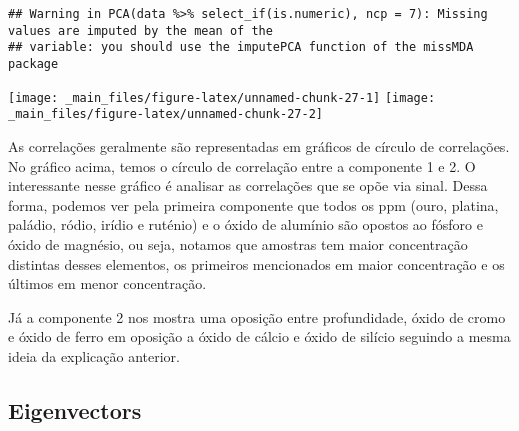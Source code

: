 \documentclass[
]{article}
\begin{document}
\begin{verbatim}
## Warning in PCA(data %>% select_if(is.numeric), ncp = 7): Missing values are imputed by the mean of the
## variable: you should use the imputePCA function of the missMDA package
\end{verbatim}

\begin{center}\texttt{[image: \_main\_files/figure-latex/unnamed-chunk-27-1]} \texttt{[image: \_main\_files/figure-latex/unnamed-chunk-27-2]} \end{center}

As correlações geralmente são representadas em gráficos de círculo de correlações. No gráfico acima, temos o círculo de correlação entre a componente 1 e 2. O interessante nesse gráfico é analisar as correlações que se opõe via sinal. Dessa forma, podemos ver pela primeira componente que todos os ppm (ouro, platina, paládio, ródio, irídio e ruténio) e o óxido de alumínio são opostos ao fósforo e óxido de magnésio, ou seja, notamos que amostras tem maior concentração distintas desses elementos, os primeiros mencionados em maior concentração e os últimos em menor concentração.

Já a componente 2 nos mostra uma oposição entre profundidade, óxido de cromo e óxido de ferro em oposição a óxido de cálcio e óxido de silício seguindo a mesma ideia da explicação anterior.

\hypertarget{eigenvectors}{%
\subsection{Eigenvectors}\label{eigenvectors}}
\end{document}

